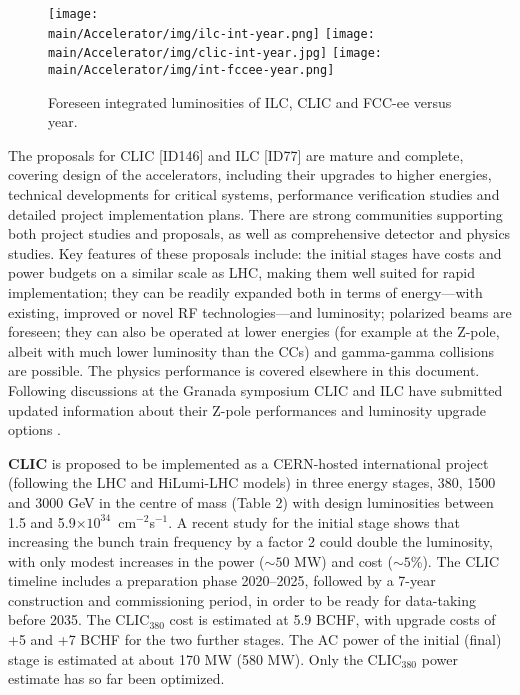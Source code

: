 \begin{figure}[ht]
\centering
\texttt{[image: \\main/Accelerator/img/ilc-int-year.png]}
\texttt{[image: \\main/Accelerator/img/clic-int-year.jpg]}
\texttt{[image: \\main/Accelerator/img/int-fccee-year.png]}
\caption{Foreseen integrated luminosities of ILC, CLIC and FCC-ee versus year.}
\label{fig:int-lumi-ee}
\end{figure}



The proposals for CLIC [ID146] and ILC [ID77] are mature and complete, covering design of the accelerators, including their upgrades to higher energies, technical developments for critical systems, performance verification studies and detailed project implementation plans. There are strong communities supporting both project studies and proposals, as well as comprehensive detector and physics studies. Key features of these proposals include: the initial stages have costs and power budgets on a similar scale as LHC, making them well suited for rapid implementation; they can be readily expanded both in terms of energy---with existing, improved or novel RF technologies---and luminosity; polarized beams are foreseen; they can also be operated at lower energies (for example at the Z-pole, albeit with much lower luminosity than the CCs) and gamma-gamma collisions are possible. The physics performance is covered elsewhere in this document. Following discussions at the Granada symposium CLIC and ILC have submitted updated information about their Z-pole performances and luminosity upgrade options \cite{Latina:2687090,ilc-zpole-2019}.



{\bf CLIC} is proposed to be implemented as a CERN-hosted international project (following the LHC and HiLumi-LHC models) in three energy stages, 380, 1500 and 3000 GeV in the centre of mass (Table 2) with design luminosities between 1.5 and 5.9$\times 10^{34}$~cm$^{-2}$s$^{-1}$. A recent study for the initial stage \cite{Latina:2687090} shows that increasing the bunch train frequency by a factor 2 could double the luminosity, with only modest increases in the power 
($\sim 50$ MW) and cost ($\sim 5$\%). The CLIC timeline includes a preparation phase 2020--2025, followed by a 7-year construction and commissioning period, in order to be ready for data-taking before 2035. The CLIC$_{380}$ cost is estimated at 5.9 BCHF, with upgrade costs of +5 and +7 BCHF for the two further stages. The AC power of the initial (final) stage is estimated at about 170 MW (580 MW). Only the CLIC$_{380}$ power estimate has so far been optimized.

